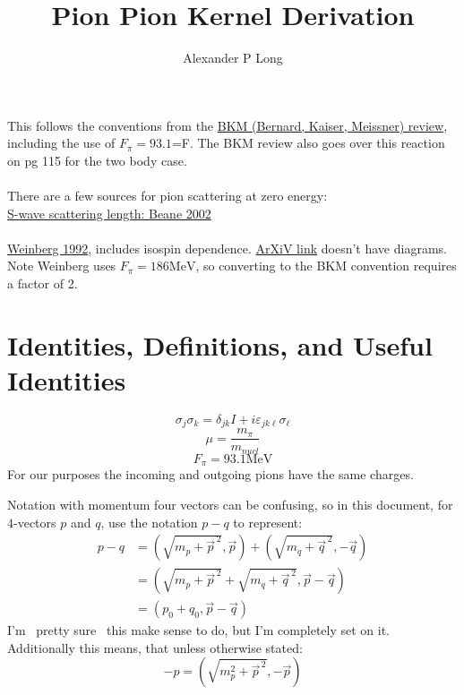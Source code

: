 \documentclass[11pt]{article}
\author{Alexander P Long}
\title{Pion Pion Kernel Derivation}
\newcommand{\sq}{^{\,2}}
\begin{document}
\maketitle
This follows the conventions from the \href{https://arxiv.org/abs/hep-ph/9501384v1}{BKM (Bernard, Kaiser, Meissner)  review}, including the use of $F_\pi=93.1$=F. The BKM review also goes over this reaction on pg 115 for the two body case.\\~\\

There are a few sources for pion scattering at zero energy:\\
\href{https://arxiv.org/abs/hep-ph/0206219v1}{S-wave scattering length: Beane 2002}\\~\\
\href{https://www.sciencedirect.com/science/article/abs/pii/037026939290099P}{Weinberg 1992}, includes isospin dependence. \href{https://arxiv.org/pdf/hep-ph/9209257.pdf}{ArXiV link} doesn't have diagrams.
Note Weinberg uses $F_\pi=186 \mathrm{MeV}$, so converting to the BKM convention requires a factor of 2.
\tableofcontents
\section{Identities, Definitions, and Useful Identities}
\begin{equation}
    \sigma_j \sigma_k = \delta_{jk} I + i \varepsilon_{jk\ell} \sigma_{\ell}
\end{equation}
\begin{equation}
    \mu= \frac{m_\pi}{m_{nucl}}
\end{equation}
\begin{equation}
    F_\pi=93.1 \mathrm{MeV}
\end{equation}
For our purposes the incoming and outgoing pions have the same charges.

Notation with momentum four vectors can be confusing, so in this document, for $4$-vectors $p$ and $q$, use the notation
$p-q$ to represent:
\begin{align}
    p-q&= (\sqrt{m_p+\vec{p}\sq}, \vec{p}) + (\sqrt{m_q+\vec{q}\sq},-\vec{q})\\
       &= \left(\sqrt{m_p+\vec{p}\sq}+\sqrt{m_q+\vec{q}\sq},\vec{p}-\vec{q} \right)\\
       &= \left(p_0+q_0,\vec{p}-\vec{q} \right)
\end{align}
I'm ~pretty sure~ this make sense to do, but I'm completely set on it. Additionally this means, that unless otherwise
stated:
\begin{equation}
    -p= \left( \sqrt{m_p^2 + \vec{p}\sq },-\vec{p} \right)
\end{equation}
\end{document}
